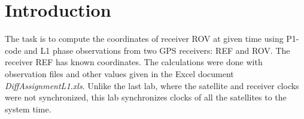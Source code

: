 
\section{Introduction} 

\label{sec:introduction}  The task is to compute the coordinates of receiver ROV at given time using P1-code  and L1 phase observations from two GPS receivers: REF and ROV. The receiver REF has known coordinates. The calculations were done with observation files and other values given in the Excel document \emph{DiffAssignmentL1.xls}. Unlike the last lab, where the satellite and receiver clocks were not synchronized, this lab synchronizes clocks of all the satellites to the system time.

